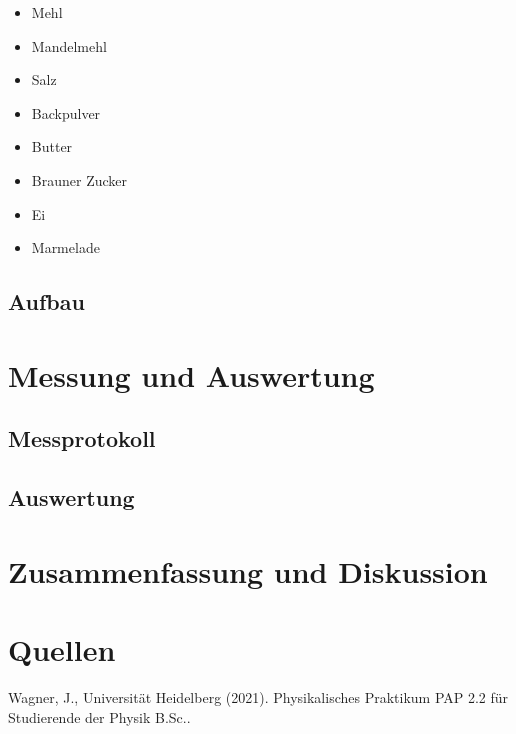 \documentclass[a4paper,12pt]{article}
\begin{document}
    \begin{itemize}
        \item Mehl
        
        \item Mandelmehl
        
        \item Salz
        
        \item Backpulver
        
        \item Butter
        
        \item Brauner Zucker
        
        \item Ei
        
        \item Marmelade
    \end{itemize}
    
    \subsection{Aufbau}
    
\newpage    
    
\section{Messung und Auswertung}

    \subsection{Messprotokoll}
    
    \subsection{Auswertung}
    
\section{Zusammenfassung und Diskussion}

\section{Quellen}

Wagner, J., Universität Heidelberg (2021). Physikalisches Praktikum PAP 2.2 für Studierende der Physik B.Sc.. 


%

\end{document}
